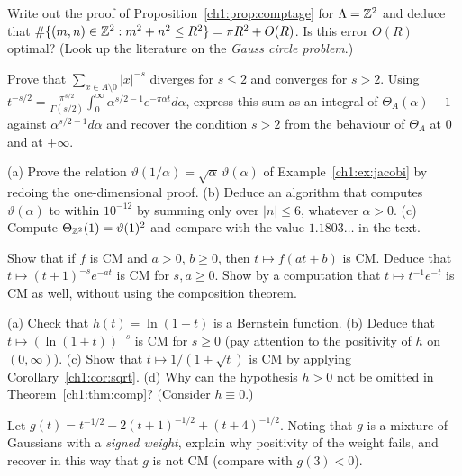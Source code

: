 \begin{exercise}[**]\label{ch1:ex:comptage}
Write out the proof of Proposition~\ref{ch1:prop:comptage} for $\Lambda=\mathbb{Z}^2$ and deduce that $\#\{(m,n)\in\mathbb{Z}^2 : m^2+n^2\le R^2\}=\pi R^2+O(R)$.
Is this error $O(R)$ optimal? (Look up the literature on the \emph{Gauss circle problem}.)
\end{exercise}

\begin{exercise}[**]\label{ch1:ex:epstein}
Prove that $\sum_{x\in A\setminus0}|x|^{-s}$ diverges for $s\le2$ and converges for $s>2$. Using $t^{-s/2}=\frac{\pi^{s/2}}{\Gamma(s/2)}\int_0^\infty\alpha^{s/2-1}e^{-\pi\alpha t}d\alpha$,
express this sum as an integral of $\Theta_A(\alpha)-1$ against $\alpha^{s/2-1}d\alpha$ and recover the condition $s>2$ from the behaviour of $\Theta_A$ at $0$ and at $+\infty$.
\end{exercise}

\begin{exercise}[**]\label{ch1:ex:poisson}
(a) Prove the relation $\vartheta(1/\alpha)=\sqrt\alpha\,\vartheta(\alpha)$ of Example~\ref{ch1:ex:jacobi} by redoing the one-dimensional proof.
(b) Deduce an algorithm that computes $\vartheta(\alpha)$ to within $10^{-12}$ by summing only over $|n|\le 6$, whatever $\alpha>0$. (c) Compute
$\Theta_{\mathbb{Z}^2}(1)=\vartheta(1)^2$ and compare with the value $1.1803\ldots$ in the text.
\end{exercise}

\begin{exercise}[*]\label{ch1:ex:clotures}
Show that if $f$ is CM and $a>0$, $b\ge0$, then $t\mapsto f(at+b)$ is CM. Deduce that $t\mapsto(t+1)^{-s}e^{-a t}$ is CM for $s,a\ge0$.
Show by a computation that $t\mapsto t^{-1}e^{-t}$ is CM as well, without using the composition theorem.
\end{exercise}

\begin{exercise}[**]\label{ch1:ex:comp}
(a) Check that $h(t)=\ln(1+t)$ is a Bernstein function. (b) Deduce that $t\mapsto(\ln(1+t))^{-s}$ is CM for $s\ge0$ (pay attention to the positivity of $h$ on $(0,\infty)$).
(c) Show that $t\mapsto1/(1+\sqrt t)$ is CM by applying Corollary~\ref{ch1:cor:sqrt}.
(d) Why can the hypothesis $h>0$ not be omitted in Theorem~\ref{ch1:thm:comp}? (Consider $h\equiv0$.)
\end{exercise}

\begin{exercise}[***]\label{ch1:ex:melange}
Let $g(t)=t^{-1/2}-2(t+1)^{-1/2}+(t+4)^{-1/2}$. Noting that $g$ is a mixture of Gaussians with a \emph{signed weight}, explain why positivity of the weight fails,
and recover in this way that $g$ is not CM (compare with $g(3)<0$).
\end{exercise}

